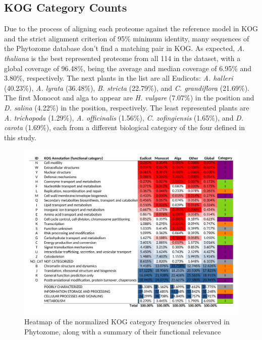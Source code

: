 \subsection{KOG Category Counts}
\label{sec:results.kogcount}


Due to the process of aligning each proteome against the 
reference model in KOG and the strict alignment criterion 
of 95\% minimum identity, many sequences of the Phytozome 
database don't find a matching pair in KOG. As expected, 
\emph{A. thaliana} is the best represented proteome from 
all 114 in the dataset, with a global coverage of 96.48\%, 
being the average and median coverage of 6.95\% and 
3.80\%, respectively. The next 
plants in the list are all Eudicots: \emph{A. halleri} (40.23\%), 
\emph{A. lyrata} (36.48\%), \emph{B. stricta} (22.79\%), and 
\emph{C. grandiflora} (21.69\%). The first Monocot and alga 
to appear are \emph{H. vulgare} (7.07\%) in the  position 
and \emph{D. salina} (4.22\%) in the  position, 
respectively. The least represented plants are 
\emph{A. trichopoda} (1.29\%), \emph{A. officinalis} (1.56\%), 
\emph{C. zofingiensis} (1.65\%), and \emph{D. carota} (1.69\%), 
each from a different biological category of the four 
defined in this study.

\begin{figure}[htp!]
\centering
\includegraphics[width=\textwidth]{figures/Heatmap_EMAO}
\caption{Heatmap of the normalized KOG category frequencies 
observed in Phytozome, along with a summary of their 
functional relevance}
\label{fig:EMAO}
\end{figure}



